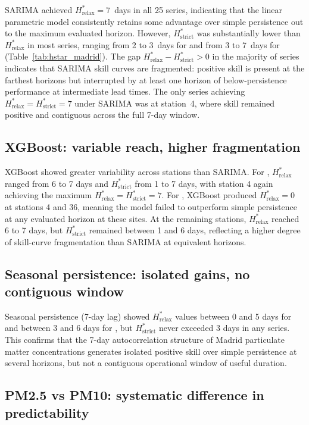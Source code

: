 \documentclass[12pt, a4paper]{article}
\newcommand{\Hrelax}{H^{*}_{\mathrm{relax}}}
\newcommand{\Hstrict}{H^{*}_{\mathrm{strict}}}
\begin{document}
SARIMA achieved $\Hrelax = 7$~days in all 25 series,
indicating that the linear parametric model consistently
retains some advantage over simple persistence out to the
maximum evaluated horizon.
However, $\Hstrict$ was substantially lower than $\Hrelax$
in most series, ranging from 2 to 3~days for 
and from 3 to 7~days for  (Table~\ref{tab:hstar_madrid}).
The gap $\Hrelax - \Hstrict > 0$ in the majority of series
indicates that SARIMA skill curves are fragmented: positive
skill is present at the farthest horizons but interrupted
by at least one horizon of below-persistence performance
at intermediate lead times.
The only series achieving $\Hrelax = \Hstrict = 7$ under
SARIMA was  at station~4, where skill remained
positive and contiguous across the full 7-day window.

\subsection{XGBoost: variable reach, higher fragmentation}
\label{sec:results_boosting}

XGBoost showed greater variability across stations than SARIMA.
For , $\Hrelax$ ranged from 6 to 7 days and
$\Hstrict$ from 1 to 7 days, with station 4 again achieving
the maximum $\Hrelax = \Hstrict = 7$.
For , XGBoost produced $\Hrelax = 0$ at stations 4
and 36, meaning the model failed to outperform simple
persistence at any evaluated horizon at these sites.
At the remaining  stations, $\Hrelax$ reached 6
to 7 days, but $\Hstrict$ remained between 1 and 6 days,
reflecting a higher degree of skill-curve fragmentation
than SARIMA at equivalent horizons.

\subsection{Seasonal persistence: isolated gains, no contiguous window}
\label{sec:results_seasonal}

Seasonal persistence (7-day lag) showed $\Hrelax$ values
between 0 and 5 days for  and between 3 and 6 days
for , but $\Hstrict$ never exceeded 3 days
in any series.
This confirms that the 7-day autocorrelation structure of
Madrid particulate matter concentrations generates isolated
positive skill over simple persistence at several horizons,
but not a contiguous operational window of useful duration.

\subsection{PM2.5 vs PM10: systematic difference in predictability}
\label{sec:results_comparison}
\end{document}
